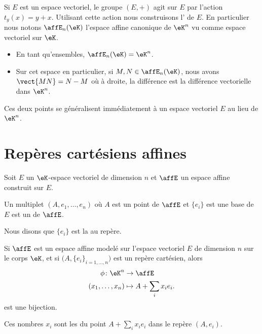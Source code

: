 \begin{normaltext}      \label{NORMooXAJLooIupekj}
	Si \( E\) est un espace vectoriel, le groupe \( (E,+)\) agit sur \( E\) par l'action \( t_y(x)=y+x\). Utilisant cette action nous construisons l' de \( E\). En particulier nous notons \( \affE_n(\eK)\) l'espace affine canonique de \( \eK^n\) vu comme espace vectoriel sur \( \eK\).
	\begin{itemize}
		\item
		      En tant qu'ensembles, \( \affE_n(\eK)=\eK^n\).
		\item
		      Sur cet espace en particulier, si \( M,N\in\affE_n(\eK)\), nous avons \( \vect{ MN }=N-M\) où à droite, la différence est la différence vectorielle dans \(\eK^n\).
	\end{itemize}

	Ces deux points se généralisent immédiatement à un espace vectoriel \( E\) au lieu de \( \eK^n\).
\end{normaltext}

\section{Repères cartésiens affines}

Soit \( E\) un \( \eK\)-espace vectoriel de dimension \( n\) et \( \affE\) un espace affine construit sur \( E\).
\begin{definition}      \label{DEFooQELZooEXvxgw}
	Un multiplet \( (A,e_1,\ldots, e_n)\) où \( A\) est un point de \( \affE\) et \( \{ e_i \}\) est une base de \( E\) est un  de \( \affE\).

	Nous disons que \( \{ e_i \}\) est la  au repère.
\end{definition}

\begin{proposition}
	Si \( \affE\) est un espace affine modelé sur l'espace vectoriel \( E\) de dimension \( n\) sur le corps \( \eK\), et si \(  \big( A,\{ e_i \}_{i=1,\ldots, n} \big)\) est un repère cartésien, alors
	\begin{equation}
		\begin{aligned}
			\phi\colon \eK^n  & \to \affE               \\
			(x_1,\ldots, x_n) & \mapsto A+\sum_ix_ie_i.
		\end{aligned}
	\end{equation}
	est une bijection.

	Ces nombres \( x_i\) sont les  du point \( A+\sum_ix_ie_i\) dans le repère \( (A,e_i)\).
\end{proposition}

